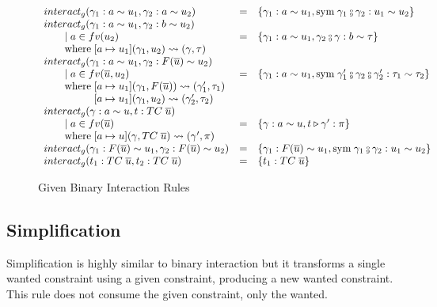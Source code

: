 \begin{figure}
\small
{}
\[
\begin{array}{l c l}
interact_g(\gamma_1 : a \sim u_1, \gamma_2 : a \sim u_2) &=& \{\gamma_1 : a \sim
u_1, \text{sym} \; \gamma_1 \fctrans \gamma_2 : u_1 \sim u_2\}
\\
interact_g(\gamma_1 : a \sim u_1, \gamma_2 : b \sim u_2)
\\ \guard a \in fv(u_2 )&=& \{\gamma_1 : a  \sim u_1, \gamma_2 \fctrans \gamma :
b \sim \tau\}
\\ \where [a \mapsto u_1](\gamma_1, u_2) \rightsquigarrow (\gamma, \tau)
\\
interact_g(\gamma_1 : a \sim u_1, \gamma_2 : F(\overline{u}) \sim u_2)
\\ \guard a \in fv(\overline{u}, u_2) &=& \{\gamma_1 : a \sim u_1, \text{sym} \;
\gamma_1' \fctrans \gamma_2 \fctrans \gamma_2': \tau_1 \sim \tau_2\}
\\ \where [a \mapsto u_1](\gamma_1, F(\overline{u})) \rightsquigarrow
(\gamma_1', \tau_1)
\\ \whereindent [a \mapsto u_1](\gamma_1, u_2) \rightsquigarrow
(\gamma_2', \tau_2)
\\
interact_g(\gamma : a \sim u, t : TC \; \overline{u})
\\ \qquad \mid a \in fv(\overline{u}) &=& \{\gamma : a \sim u, t \triangleright
\gamma' : \pi\}
\\ \where [a \mapsto u](\gamma, TC \; \overline{u}) \rightsquigarrow
(\gamma', \pi)
\\
interact_g(\gamma_1 : F(\overline{u}) \sim u_1, \gamma_2 : F(\overline{u}) \sim
u_2) &=& \{\gamma_1 : F(\overline{u}) \sim u_1, \text{sym} \; \gamma_1 \fctrans
\gamma_2: u_1 \sim u_2\}
\\
interact_g(t_1 : TC \; \overline{u}, t_2 : TC \; \overline{u}) &=& \{t_1 : TC \;
\overline{u}\}
\end{array}
\]
\caption{Given Binary Interaction Rules}
\label{fig:interact_g}
\end{figure}

\subsection{Simplification}
Simplification is highly similar to binary interaction but it transforms a
single wanted constraint using a given constraint, producing a new wanted
constraint. This rule does not consume the given constraint, only the wanted.

